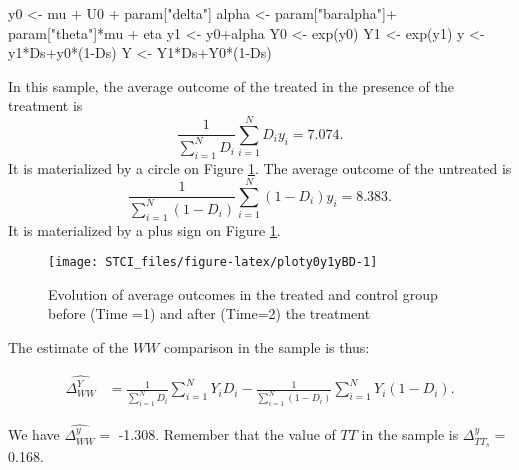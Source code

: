\documentclass[
]{book}
\newenvironment{Shaded}{\begin{snugshade}}{\end{snugshade}}
\newcommand{\DecValTok}[1]{\textcolor[rgb]{0.00,0.00,0.81}{#1}}
\newcommand{\FunctionTok}[1]{\textcolor[rgb]{0.00,0.00,0.00}{#1}}
\newcommand{\NormalTok}[1]{#1}
\newcommand{\OtherTok}[1]{\textcolor[rgb]{0.56,0.35,0.01}{#1}}
\newcommand{\SpecialCharTok}[1]{\textcolor[rgb]{0.00,0.00,0.00}{#1}}
\newcommand{\StringTok}[1]{\textcolor[rgb]{0.31,0.60,0.02}{#1}}
\theoremstyle{definition}
\theoremstyle{definition}
\theoremstyle{definition}
\theoremstyle{definition}
\theoremstyle{remark}
\begin{document}
\begin{Shaded}
\begin{Highlighting}[]
\NormalTok{y0 }\OtherTok{\textless{}{-}}\NormalTok{ mu }\SpecialCharTok{+}\NormalTok{  U0 }\SpecialCharTok{+}\NormalTok{ param[}\StringTok{"delta"}\NormalTok{]}
\NormalTok{alpha }\OtherTok{\textless{}{-}}\NormalTok{ param[}\StringTok{"baralpha"}\NormalTok{]}\SpecialCharTok{+}\NormalTok{  param[}\StringTok{"theta"}\NormalTok{]}\SpecialCharTok{*}\NormalTok{mu }\SpecialCharTok{+}\NormalTok{ eta}
\NormalTok{y1 }\OtherTok{\textless{}{-}}\NormalTok{ y0}\SpecialCharTok{+}\NormalTok{alpha}
\NormalTok{Y0 }\OtherTok{\textless{}{-}} \FunctionTok{exp}\NormalTok{(y0)}
\NormalTok{Y1 }\OtherTok{\textless{}{-}} \FunctionTok{exp}\NormalTok{(y1)}
\NormalTok{y }\OtherTok{\textless{}{-}}\NormalTok{ y1}\SpecialCharTok{*}\NormalTok{Ds}\SpecialCharTok{+}\NormalTok{y0}\SpecialCharTok{*}\NormalTok{(}\DecValTok{1}\SpecialCharTok{{-}}\NormalTok{Ds)}
\NormalTok{Y }\OtherTok{\textless{}{-}}\NormalTok{ Y1}\SpecialCharTok{*}\NormalTok{Ds}\SpecialCharTok{+}\NormalTok{Y0}\SpecialCharTok{*}\NormalTok{(}\DecValTok{1}\SpecialCharTok{{-}}\NormalTok{Ds)}
\end{Highlighting}
\end{Shaded}

In this sample, the average outcome of the treated in the presence of the treatment is
\[
\frac{1}{\sum_{i=1}^ND_i}\sum_{i=1}^ND_iy_i= 7.074.
\]
It is materialized by a circle on Figure \ref{fig:ploty0y1yBD}.
The average outcome of the untreated is
\[
\frac{1}{\sum_{i=1}^N(1-D_i)}\sum_{i=1}^N(1-D_i)y_i= 8.383.
\]
It is materialized by a plus sign on Figure \ref{fig:ploty0y1yBD}.

\begin{figure}

{\centering \texttt{[image: STCI\_files/figure-latex/ploty0y1yBD-1]} 

}

\caption{Evolution of average outcomes in the treated and control group before (Time =1) and after (Time=2) the treatment}\label{fig:ploty0y1yBD}
\end{figure}

The estimate of the \(WW\) comparison in the sample is thus:

\begin{align*}
\hat{\Delta^Y_{WW}} & = \frac{1}{\sum_{i=1}^N D_i}\sum_{i=1}^N Y_iD_i-\frac{1}{\sum_{i=1}^N (1-D_i)}\sum_{i=1}^N Y_i(1-D_i).
\end{align*}

We have \(\hat{\Delta^y_{WW}}=\) -1.308.
Remember that the value of \(TT\) in the sample is \(\Delta^y_{TT_s}=\) 0.168.
\end{document}
